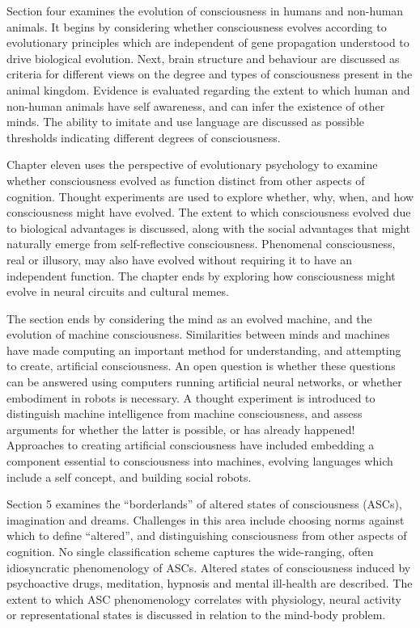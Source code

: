 \documentclass[a4paper]{article}
\begin{document}
Section four examines the evolution of consciousness in humans and non-human
animals. It begins by considering whether consciousness evolves according to
evolutionary principles which are independent of gene propagation understood
to drive biological evolution. Next, brain structure and behaviour are
discussed as criteria for different views on the degree and types of
consciousness present in the animal kingdom. Evidence is evaluated regarding
the extent to which human and non-human animals have self awareness, and can
infer the existence of other minds. The ability to imitate and use language
are discussed as possible thresholds indicating different degrees of
consciousness.

Chapter eleven uses the perspective of evolutionary psychology to examine
whether consciousness evolved as function distinct from other aspects of
cognition. Thought experiments are used to explore whether, why, when, and how
consciousness might have evolved. The extent to which consciousness evolved
due to biological advantages is discussed, along with the social advantages
that might naturally emerge from self-reflective consciousness. Phenomenal
consciousness, real or illusory, may also have evolved without requiring it to
have an independent function. The chapter ends by exploring how consciousness
might evolve in neural circuits and cultural memes.

The section ends by considering the mind as an evolved machine, and the
evolution of machine consciousness. Similarities between minds and machines
have made computing an important method for understanding, and attempting to
create, artificial consciousness. An open question is whether these questions
can be answered using computers running artificial neural networks, or whether
embodiment in robots is necessary. A thought experiment is introduced to
distinguish machine intelligence from machine consciousness, and assess
arguments for whether the latter is possible, or has already happened!
Approaches to creating artificial consciousness have included embedding a
component essential to consciousness into machines, evolving languages which
include a self concept, and building social robots.

Section 5 examines the ``borderlands'' of altered states of consciousness
(ASCs), imagination and dreams. Challenges in this area include choosing norms
against which to define ``altered'', and distinguishing consciousness from
other aspects of cognition. No single classification scheme captures the
wide-ranging, often idiosyncratic phenomenology of ASCs. Altered states of
consciousness induced by psychoactive drugs, meditation, hypnosis and mental
ill-health are described. The extent to which ASC phenomenology correlates
with physiology, neural activity or representational states is discussed in
relation to the mind-body problem.
\end{document}
